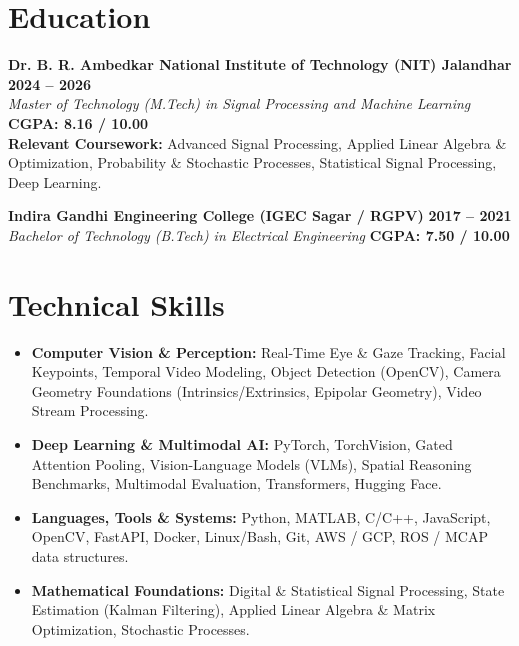 \documentclass[10pt,a4paper]{article}
\begin{document}
\section*{Education}

\noindent\textbf{Dr. B. R. Ambedkar National Institute of Technology (NIT) Jalandhar} \hfill \textbf{2024 -- 2026} \\
\textit{Master of Technology (M.Tech) in Signal Processing and Machine Learning} \hfill \textbf{CGPA: 8.16 / 10.00} \\
\footnotesize\textbf{Relevant Coursework:} Advanced Signal Processing, Applied Linear Algebra \& Optimization, Probability \& Stochastic Processes, Statistical Signal Processing, Deep Learning.

\vspace{2pt}
\noindent\textbf{Indira Gandhi Engineering College (IGEC Sagar / RGPV)} \hfill \textbf{2017 -- 2021} \\
\textit{Bachelor of Technology (B.Tech) in Electrical Engineering} \hfill \textbf{CGPA: 7.50 / 10.00}

\section*{Technical Skills}
\noindent\small
\begin{itemize}[leftmargin=1.1em, itemsep=0.8pt]
    \item \textbf{Computer Vision \& Perception:} Real-Time Eye \& Gaze Tracking, Facial Keypoints, Temporal Video Modeling, Object Detection (OpenCV), Camera Geometry Foundations (Intrinsics/Extrinsics, Epipolar Geometry), Video Stream Processing.
    \item \textbf{Deep Learning \& Multimodal AI:} PyTorch, TorchVision, Gated Attention Pooling, Vision-Language Models (VLMs), Spatial Reasoning Benchmarks, Multimodal Evaluation, Transformers, Hugging Face.
    \item \textbf{Languages, Tools \& Systems:} Python, MATLAB, C/C++, JavaScript, OpenCV, FastAPI, Docker, Linux/Bash, Git, AWS / GCP, ROS / MCAP data structures.
    \item \textbf{Mathematical Foundations:} Digital \& Statistical Signal Processing, State Estimation (Kalman Filtering), Applied Linear Algebra \& Matrix Optimization, Stochastic Processes.
\end{itemize}
\end{document}
